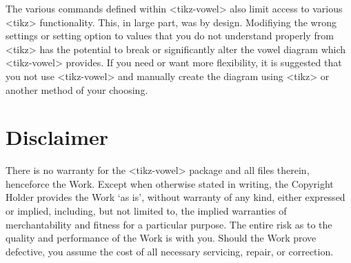 \documentclass{article}
\newcommand{\pkg}[1]{\texttt{#1}}
\def\\{}%
\def\texttt#1{<#1>}%
\begin{document}
The various commands defined within \pkg{tikz-vowel} also limit access to various \pkg{tikz} functionality.  This, in large part, was by design.  Modifiying the wrong settings or setting option to values that you do not understand properly from \pkg{tikz} has the potential to break or significantly alter the vowel diagram which \pkg{tikz-vowel} provides.  If you need or want more flexibility, it is suggested that you not use \pkg{tikz-vowel} and manually create the diagram using \pkg{tikz} or another method of your choosing.






\section{Disclaimer}
\label{sec:Disclaimer}

There is no warranty for the \pkg{tikz-vowel} package and all files therein, henceforce the Work. Except when otherwise stated in writing, the Copyright Holder provides the Work `as is’, without warranty of any kind, either expressed or implied, including, but not limited to, the implied warranties of merchantability and fitness for a particular purpose. The entire risk as to the quality and performance of the Work is with you. Should the Work prove defective, you assume the cost of all necessary servicing, repair, or correction.
\end{document}

